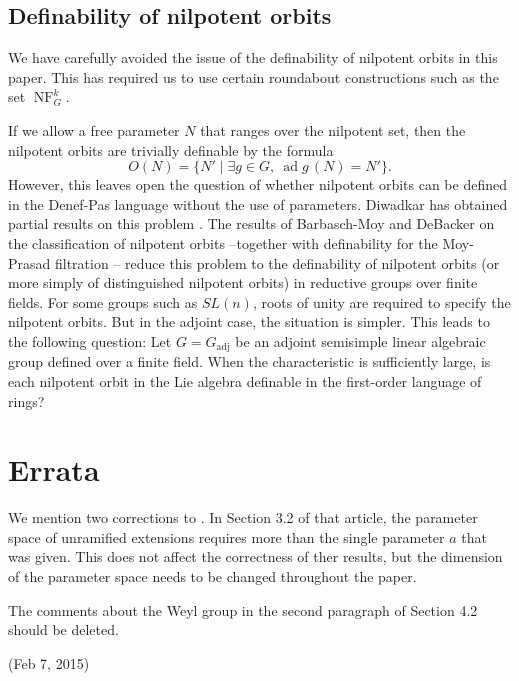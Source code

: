 \documentclass[12pt]{amsart}
\newcommand{\op}[1]{\operatorname{#1}}
\def\NF{\op{NF}}
\theoremstyle{plain}
\theoremstyle{definition}
\begin{document}
\subsection{Definability of nilpotent orbits}

We have carefully avoided the issue of the definability of nilpotent
orbits in this paper.  This has required us to use certain roundabout
constructions such as the set $\NF^k_G$.

If we allow a free parameter $N$ that ranges over the nilpotent set,
then the nilpotent orbits are trivially definable by the formula
\[
O(N) = \{N' \mid \exists g\in G,~ \op{ad}g\,(N) = N' \}.
\]  
However, this leaves open the question of whether nilpotent orbits can
be defined in the Denef-Pas language without the use of parameters.
Diwadkar has obtained partial results on this problem
\cite{diwadkar2006nilpoten}.  The results of Barbasch-Moy and DeBacker
on the classification of nilpotent orbits --together with definability
for the Moy-Prasad filtration \cite{CGH} -- reduce this problem to the
definability of nilpotent orbits (or more simply of distinguished
nilpotent orbits) in reductive groups over finite fields.  For some
groups such as $SL(n)$, roots of unity are required to specify the
nilpotent orbits.  But in the adjoint case, the situation is
simpler. This leads to the following question: Let $G=G_{\op{adj}}$ be
an adjoint semisimple linear algebraic group defined over a finite
field.  When the characteristic is sufficiently large, is each
nilpotent orbit in the Lie algebra definable in the first-order
language of rings?

\section{Errata}

We mention two corrections to \cite{CHL}.  In Section 3.2 of that
article, the parameter space of unramified extensions requires more
than the single parameter $a$ that was given.  This does not affect
the correctness of ther results, but the dimension of the parameter
space needs to be changed throughout the paper.

The comments about the Weyl group in the second paragraph of
Section 4.2 should be deleted.





(Feb 7, 2015)
\end{document}
